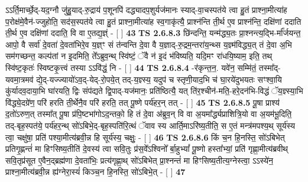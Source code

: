 \documentclass[17pt]{extarticle}
\begin{document}
                  ऽऽर्ति॒मार्च्छे॒द्-यद॒ग्नौ जु॑हु॒याद्-रु॒द्राय॑ प॒शूनपि॑ दद्ध्यादप॒शुर्यज॑मानः स्याद्-वा॒चस्पत॑ये त्वा हु॒तं प्राश्ना॒मीत्या॑ह प॒रोक्ष॑मे॒वैन॑-ज्जुहोति॒ सद॑स॒स्पत॑ये त्वा हु॒तं प्राश्ना॒मीत्या॑ह स्व॒गाकृ॑त्यै॒ प्राश्न॑न्ति ती॒र्थ ए॒व प्राश्न॑न्ति॒ दक्षि॑णां ददाति ती॒र्थ ए॒व दक्षि॑णां ददाति॒ वि वा ए॒तद्य॒ज्ञ्ं - [  ] \textbf{  43} \newline
                  \newline
                                \textbf{ TS 2.6.8.3} \newline
                  छि॑न्दन्ति॒ यन्म॑द्ध्य॒तः प्रा॒श्नन्त्य॒द्भि-र्मा᳚र्जयन्त॒ आपो॒ वै सर्वा॑ दे॒वता॑ दे॒वता॑भिरे॒व य॒ज्ञ्ꣳ सं त॑न्वन्ति दे॒वा वै य॒ज्ञाद्-रु॒द्रम॒न्तरा॑य॒न्थ्स य॒ज्ञ्म॑विद्ध्य॒त् तं दे॒वा अ॒भि सम॑गच्छन्त॒ कल्प॑तां न इ॒दमिति॒ ते᳚ऽब्रुव॒न्थ् स्वि॑ष्टं॒ ॅवै न॑ इ॒दं भ॑विष्यति॒ यदि॒मꣳ रा॑धयि॒ष्याम॒ इति॒ तथ् स्वि॑ष्ट॒कृतः॑ स्विष्टकृ॒त्त्वं तस्या ऽऽवि॑द्धं॒ नि - [  ] \textbf{  44} \newline
                  \newline
                                \textbf{ TS 2.6.8.4} \newline
                  -र॑कृन्त॒न॒. यवे॑न॒ सम्मि॑तं॒ तस्मा᳚द्-यवमा॒त्रमव॑ द्ये॒द्-यज्ज्यायो॑ऽव॒द्-येद्-रो॒पये॒त् तद्-य॒ज्ञ्स्य॒ यदुप॑ च स्तृणी॒याद॒भि च॑ घा॒रये॑दुभयतः सꣳश्वा॒यि कु॑र्यादव॒दाया॒भि घा॑रयति॒ द्विः संप॑द्यते द्वि॒पाद्-यज॑मानः॒ प्रति॑ष्ठित्यै॒ यत् ति॑र॒श्चीन॑-मति॒-हरे॒दन॑भि-विद्धं ॅय॒ज्ञ्स्या॒भि वि॑द्ध्ये॒दग्रे॑ण॒ परि॑ हरति ती॒र्थेनै॒व परि॑ हरति॒ तत् पू॒ष्णे पर्य॑हर॒न् तत् - [  ] \textbf{  45} \newline
                  \newline
                                \textbf{ TS 2.6.8.5} \newline
                  पू॒षा प्राश्य॑ द॒तो॑ऽरुण॒त् तस्मा᳚त् पू॒षा प्र॑पि॒ष्टभा॑गोऽद॒न्तको॒ हि तं दे॒वा अ॑ब्रुव॒न् वि वा अ॒यमा᳚र्द्ध्यप्राशित्रि॒यो वा अ॒यम॑भू॒दिति॒ तद्-बृह॒स्पत॑ये॒ पर्य॑हर॒न्थ् सो॑ऽबिभे॒द्-बृह॒स्पति॑रि॒त्थं ॅवाव स्य आर्ति॒माऽरि॑ष्य॒तीति॒ स ए॒तं मन्त्र॑मपश्य॒थ् सूर्य॑स्य त्वा॒ चक्षु॑षा॒ प्रति॑ पश्या॒मीत्य॑ब्रवी॒न्न हि सूर्य॑स्य॒ चक्षुः॒ - [  ] \textbf{  46} \newline
                  \newline
                                \textbf{ TS 2.6.8.6} \newline
                  किं च॒न हि॒नस्ति॒ सो॑ऽबिभेत् प्रतिगृ॒ह्णन्तं॑ मा हिꣳसिष्य॒तीति॑ दे॒वस्य॑ त्वा सवि॒तुः प्र॑स॒वे᳚ऽश्विनो᳚ र्बा॒हुभ्यां᳚ पू॒ष्णो हस्ता᳚भ्यां॒ प्रति॑ गृह्णा॒मीत्य॑ब्रवीथ् सवि॒तृप्र॑सूत ए॒वैन॒द्ब्रह्म॑णा दे॒वता॑भिः॒ प्रत्य॑गृह्णा॒थ् सो॑ऽबिभेत् प्रा॒श्नन्तं॑ मा हिꣳसिष्य॒तीत्य॒ग्नेस्त्वा॒ ऽऽस्ये॑न॒ प्राश्ना॒मीत्य॑ब्रवी॒न्न ह्य॑ग्नेरा॒स्यं॑ किञ्च॒न हि॒नस्ति॒ सो॑ऽबिभे॒त् - [  ] \textbf{  47} \newline
\end{document}
